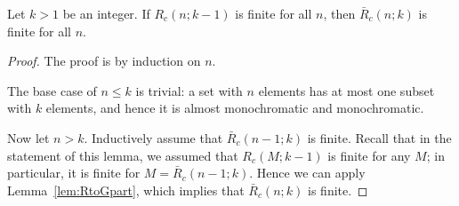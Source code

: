 \begin{lemma}\label{lem:RtoG}
    Let $k > 1$ be an integer.
    If $R_c(n;k-1)$ is finite for all $n$, then $\bar{R}_c(n;k)$ is finite for all $n$.
\end{lemma}
\begin{proof}
    The proof is by induction on $n$.
    
    The base case of $n \le k$ is trivial: a set with $n$ elements has at most one subset with $k$ elements, and hence it is almost monochromatic and monochromatic.
    
    Now let $n > k$. Inductively assume that $\bar{R}_c(n-1;k)$ is finite. Recall that in the statement of this lemma, we assumed that $R_c(M;k-1)$ is finite for any $M$; in particular, it is finite for $M = \bar{R}_c(n-1;k)$. Hence we can apply Lemma~\ref{lem:RtoGpart}, which implies that $\bar{R}_c(n;k)$ is finite.
\end{proof}

